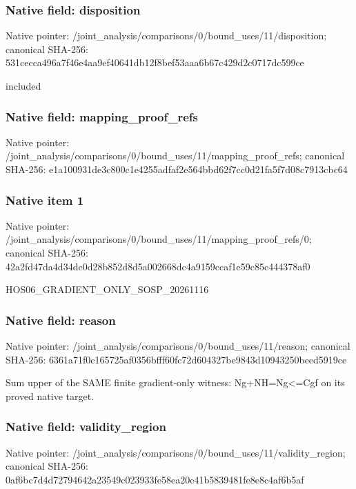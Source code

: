 \documentclass[10pt,a4paper]{article}
\begin{document}
\subsubsection{Native field: disposition}
Native pointer: /joint\_\allowbreak{}analysis/comparisons/0/bound\_\allowbreak{}uses/11/disposition; canonical SHA-256: 531cecca496a7f46e4aa9ef40641db12f8bef53aaa6b67c429d2c0717dc599ce

\begingroup\raggedright\sloppy included\par\endgroup

\subsubsection{Native field: mapping\_\allowbreak{}proof\_\allowbreak{}refs}
Native pointer: /joint\_\allowbreak{}analysis/comparisons/0/bound\_\allowbreak{}uses/11/mapping\_\allowbreak{}proof\_\allowbreak{}refs; canonical SHA-256: e1a100931de3c800c1e4255adfaf2e564bbd62f7cc0d21fa5f7d08c7913cbc64

\subsubsection{Native item 1}
Native pointer: /joint\_\allowbreak{}analysis/comparisons/0/bound\_\allowbreak{}uses/11/mapping\_\allowbreak{}proof\_\allowbreak{}refs/0; canonical SHA-256: 42a2fd47da4d34dc0d28b852d8d5a002668dc4a9159ccaf1e59c85c444378af0

\begingroup\raggedright\sloppy HOS06\_\allowbreak{}GRADIENT\_\allowbreak{}ONLY\_\allowbreak{}SOSP\_\allowbreak{}20261116\par\endgroup

\subsubsection{Native field: reason}
Native pointer: /joint\_\allowbreak{}analysis/comparisons/0/bound\_\allowbreak{}uses/11/reason; canonical SHA-256: 6361a71f0c165725af0356bfff60fc72d604327be9843d10943250beed5919ce

\begingroup\raggedright\sloppy Sum upper of the SAME finite gradient-only witness:\allowbreak{} Ng+NH=\allowbreak{}Ng<=\allowbreak{}Cgf on its proved native target.\par\endgroup

\subsubsection{Native field: validity\_\allowbreak{}region}
Native pointer: /joint\_\allowbreak{}analysis/comparisons/0/bound\_\allowbreak{}uses/11/validity\_\allowbreak{}region; canonical SHA-256: 0af6bc7d4d72794642a23549c023933fe58ea20e41b5839481fe8e8c4af6b5af
\end{document}
